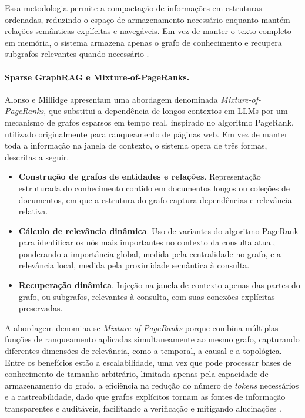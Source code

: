Essa metodologia permite a compactação de informações em estruturas ordenadas, reduzindo o espaço de armazenamento necessário enquanto mantém relações semânticas explícitas e navegáveis. Em vez de manter o texto completo em memória, o sistema armazena apenas o grafo de conhecimento e recupera subgrafos relevantes quando necessário \cite{alonso2024mixturepageranks}.

\paragraph{Sparse GraphRAG e Mixture-of-PageRanks.}
Alonso e Millidge \cite{alonso2024mixturepageranks} apresentam uma abordagem denominada \textit{Mixture-of-PageRanks}, que substitui a dependência de longos contextos em LLMs por um mecanismo de grafos esparsos em tempo real, inspirado no algoritmo PageRank, utilizado originalmente para ranqueamento de páginas web. Em vez de manter toda a informação na janela de contexto, o sistema opera de três formas, descritas a seguir.

\begin{itemize}[leftmargin=1.6em]
\item \textbf{Construção de grafos de entidades e relações}. Representação estruturada do conhecimento contido em documentos longos ou coleções de documentos, em que a estrutura do grafo captura dependências e relevância relativa.

\item \textbf{Cálculo de relevância dinâmica}. Uso de variantes do algoritmo PageRank para identificar os nós mais importantes no contexto da consulta atual, ponderando a importância global, medida pela centralidade no grafo, e a relevância local, medida pela proximidade semântica à consulta.

\item \textbf{Recuperação dinâmica}. Injeção na janela de contexto apenas das partes do grafo, ou subgrafos, relevantes à consulta, com suas conexões explícitas preservadas.
\end{itemize}

A abordagem denomina-se \textit{Mixture-of-PageRanks} porque combina múltiplas funções de ranqueamento aplicadas simultaneamente ao mesmo grafo, capturando diferentes dimensões de relevância, como a temporal, a causal e a topológica. Entre os benefícios estão a escalabilidade, uma vez que pode processar bases de conhecimento de tamanho arbitrário, limitada apenas pela capacidade de armazenamento do grafo, a eficiência na redução do número de \textit{tokens} necessários e a rastreabilidade, dado que grafos explícitos tornam as fontes de informação transparentes e auditáveis, facilitando a verificação e mitigando alucinações \cite{alonso2024mixturepageranks}.

